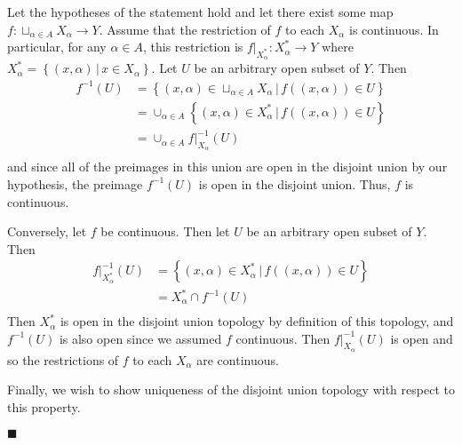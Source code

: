 \documentclass[12pt]{article}
\renewcommand{\qed}{\hfill$\blacksquare$}
\renewenvironment{proof}{\begin{addmargin}[1em]{0em}\begin{newproof}}{\end{newproof}\end{addmargin}\qed}
\begin{document}
\begin{proof}
Let the hypotheses of the statement hold and let there exist some map $f:\sqcup_{\alpha \in A} X_{\alpha}\rightarrow Y$. Assume that the restriction of $f$ to each $X_{\alpha}$ is continuous. In particular, for any $\alpha \in A$, this restriction is $f|_{X_{\alpha}^*}: X_{\alpha}^* \rightarrow Y$ where $X_{\alpha}^* = \left\{\left(x,\alpha\right)\, | \, x\in X_{\alpha}\right\}$. Let $U$ be an arbitrary open subset of $Y$. Then
\begin{equation*}\begin{split}
f^{-1}\left(U\right) & = \left\{ \left(x,\alpha\right) \in \sqcup_{\alpha \in A} X_{\alpha} \, | \, f\left(\left(x,\alpha\right)\right) \in U\right\} \\
& = \cup_{\alpha \in A} \left\{ \left(x,\alpha\right) \in X_{\alpha}^* \, | \, f\left(\left(x,\alpha\right)\right) \in U \right\} \\
& = \cup_{\alpha \in A} f|_{X_{\alpha}}^{-1}\left(U\right) \\
\end{split}\end{equation*}
and since all of the preimages in this union are open in the disjoint union by our hypothesis, the preimage $f^{-1}\left(U\right)$ is open in the disjoint union. Thus, $f$ is continuous.

Conversely, let $f$ be continuous. Then let $U$ be an arbitrary open subset of $Y$. Then
\begin{equation*}\begin{split}
f|_{X_{\alpha}^*}^{-1}\left(U\right) & = \left\{ \left(x,\alpha\right) \in X_{\alpha}^* \, | \, f\left(\left(x,\alpha\right)\right) \in U \right\} \\
& = X_{\alpha}^* \cap f^{-1}\left(U\right) \\
\end{split}\end{equation*}
Then $X_{\alpha}^*$ is open in the disjoint union topology by definition of this topology, and $f^{-1}\left(U\right)$ is also open since we assumed $f$ continuous. Then $f|_{X_{\alpha}}^{-1}\left(U\right)$ is open and so the restrictions of $f$ to each $X_{\alpha}$ are continuous.

Finally, we wish to show uniqueness of the disjoint union topology with respect to this property.


\end{proof}
\end{document}

